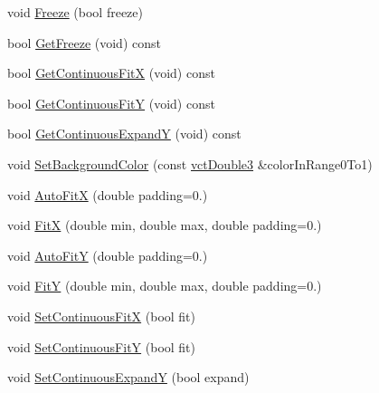 \begin{DoxyCompactItemize}
\item 
void \hyperlink{classvct_plot2_d_base_afb5501f6c0d7af0d059a6dccb323f744}{Freeze} (bool freeze)
\item 
bool \hyperlink{classvct_plot2_d_base_a138e78a2bdf6dff6fb555a283665399f}{Get\+Freeze} (void) const 
\item 
bool \hyperlink{classvct_plot2_d_base_a4a7fdde81c3dc143b9c0e67462803b76}{Get\+Continuous\+Fit\+X} (void) const 
\item 
bool \hyperlink{classvct_plot2_d_base_a1146a1876ed4173be9fcfc78b27c43e0}{Get\+Continuous\+Fit\+Y} (void) const 
\item 
bool \hyperlink{classvct_plot2_d_base_ac21178c8e2bb5fc56200dd7ec317ec3f}{Get\+Continuous\+Expand\+Y} (void) const 
\item 
void \hyperlink{classvct_plot2_d_base_af262d44ee5bdf00ce6df30dcec4de7ba}{Set\+Background\+Color} (const \hyperlink{vct_fixed_size_vector_types_8h_a4a89122c9d7f72c3f31fe8126e17c3af}{vct\+Double3} \&color\+In\+Range0\+To1)
\end{DoxyCompactItemize}
{\bf }\par
\begin{DoxyCompactItemize}
\item 
void \hyperlink{classvct_plot2_d_base_a9c500da34e1f93757c2105856bf41832}{Auto\+Fit\+X} (double padding=0.)
\item 
void \hyperlink{classvct_plot2_d_base_ab60d6ea3958deace31cd666e27e4b4bd}{Fit\+X} (double min, double max, double padding=0.)
\item 
void \hyperlink{classvct_plot2_d_base_aa2a186f9b941b1ebcb67e6ba860c926e}{Auto\+Fit\+Y} (double padding=0.)
\item 
void \hyperlink{classvct_plot2_d_base_af8adacad97c6a7cfc901cc67e5f3cb83}{Fit\+Y} (double min, double max, double padding=0.)
\end{DoxyCompactItemize}

{\bf }\par
\begin{DoxyCompactItemize}
\item 
void \hyperlink{classvct_plot2_d_base_ac9521c8a97281f64c2e8d31cd9aea224}{Set\+Continuous\+Fit\+X} (bool fit)
\item 
void \hyperlink{classvct_plot2_d_base_aed048c9688484c5b7b94b4960018810d}{Set\+Continuous\+Fit\+Y} (bool fit)
\item 
void \hyperlink{classvct_plot2_d_base_aa1607f7cd083d1410f7cb6f113993b84}{Set\+Continuous\+Expand\+Y} (bool expand)
\end{DoxyCompactItemize}

